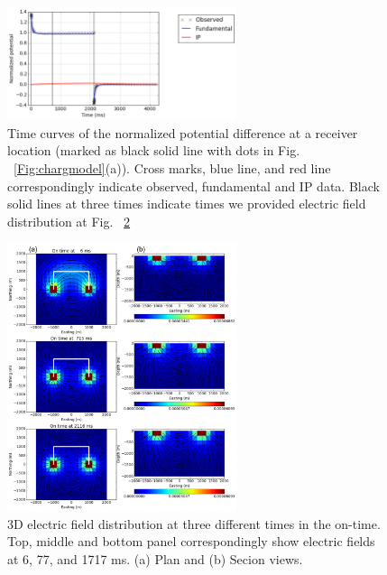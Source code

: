 \documentclass[letterpaper,11pt]{article}
\begin{document}
\begin{figure}[htb]
  \centering
  \includegraphics[width=0.6\textwidth]{figures/DecayFullResis.png}
  \caption{Time curves of the normalized potential difference at a receiver location (marked as black solid line with dots in Fig. ~\ref{Fig:chargmodel}(a)). Cross marks, blue line, and red line correspondingly indicate observed, fundamental and IP data. Black solid lines at three times indicate times we provided electric field distribution at Fig. ~\ref{Fig:EvecResisfull}}
  \label{Fig:DecayFullResis}
\end{figure}

\begin{figure}[htb]
  \centering
  \includegraphics[width=0.6\textwidth]{figures/EvecResisfull.png}
  \caption{3D electric field distribution at three different times in the on-time. Top, middle and bottom panel correspondingly show electric fields at 6, 77, and 1717 ms. (a) Plan and (b) Secion views. }
  \label{Fig:EvecResisfull}
\end{figure}
\end{document}
